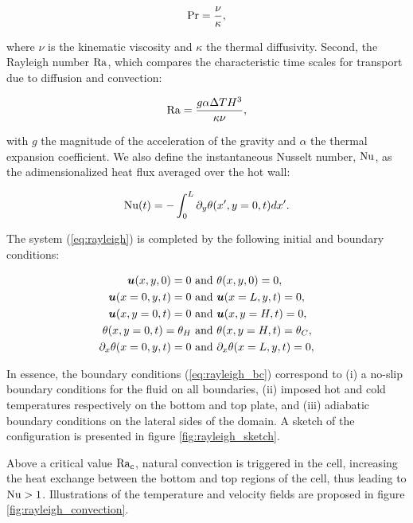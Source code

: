 \begin{equation*}
	\text{Pr} = \frac{\nu}{\kappa},
\end{equation*}

where $\nu$ is the kinematic viscosity and $\kappa$ the thermal diffusivity. Second, the Rayleigh number $\text{Ra}$, which compares the characteristic time scales for transport due to diffusion and convection:

\begin{equation*}
	\text{Ra} = \frac{g \alpha \Delta T H^3}{\kappa \nu},
\end{equation*}

with $g$ the magnitude of the acceleration of the gravity and $\alpha$ the thermal expansion coefficient. We also define the instantaneous Nusselt number, $\text{Nu}$, as the adimensionalized heat flux averaged over the hot wall:

\begin{equation}
\label{eq:nusselt}
	\text{Nu} (t) = - \int_{0}^{L} \partial_y \theta (x',y=0,t) dx'.
\end{equation}

The system (\ref{eq:rayleigh}) is completed by the following initial and boundary conditions:

\begin{equation}
\label{eq:rayleigh_bc}
\begin{split}
	\bm{u}(x,y,0)	= 0 &\text{ and } \theta(x,y,0)	= 0, \\
	\bm{u}(x=0,y,t)	= 0 &\text{ and } \bm{u}(x=L,y,t) = 0, \\
	\bm{u}(x,y=0,t)	= 0 &\text{ and } \bm{u}(x,y=H,t) = 0, \\
	\theta(x,y=0,t) 	= \theta_H &\text{ and } \theta(x,y=H,t) = \theta_C, \\
	\partial_x \theta(x=0,y,t) = 0 &\text{ and } \partial_x \theta(x=L,y,t) = 0,
\end{split}
\end{equation}

In essence, the boundary conditions (\ref{eq:rayleigh_bc}) correspond to (i) a no-slip boundary conditions for the fluid on all boundaries, (ii) imposed hot and cold temperatures respectively on the bottom and top plate, and (iii) adiabatic boundary conditions on the lateral sides of the domain. A sketch of the configuration is presented in figure \ref{fig:rayleigh_sketch}.



Above a critical value $\text{Ra}_c$, natural convection is triggered in the cell, increasing the heat exchange between the bottom and top regions of the cell, thus leading to $\text{Nu} > 1$. Illustrations of the temperature and velocity fields are proposed in figure \ref{fig:rayleigh_convection}.

